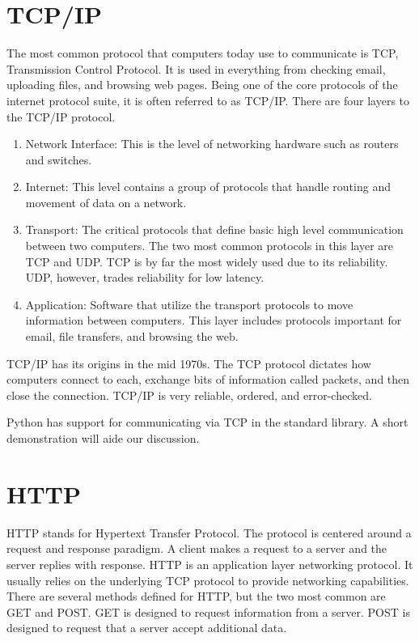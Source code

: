 \section*{TCP/IP}
The most common protocol that computers today use to communicate is TCP, Transmission Control Protocol.
It is used in everything from checking email, uploading files, and browsing web pages.
Being one of the core protocols of the internet protocol suite, it is often referred to as TCP/IP.
There are four layers to the TCP/IP protocol.
\begin{enumerate}
\item Network Interface: This is the level of networking hardware such as routers and switches.
\item Internet: This level contains a group of protocols that handle routing and movement of data on a network.
\item Transport: The critical protocols that define basic high level communication between two computers.
The two most common protocols in this layer are TCP and UDP.  TCP is by far the most widely used due to its reliability.
UDP, however, trades reliability for low latency.
\item Application: Software that utilize the transport protocols to move information between computers.
This layer includes protocols important for email, file transfers, and browsing the web.
\end{enumerate}

TCP/IP has its origins in the mid 1970s.
The TCP protocol dictates how computers connect to each, exchange bits of information called packets, and then close the connection.
TCP/IP is very reliable, ordered, and error-checked.

Python has support for communicating via TCP in the standard library.
A short demonstration will aide our discussion.




\section*{HTTP}
HTTP stands for Hypertext Transfer Protocol.
The protocol is centered around a request and response paradigm.
A client makes a request to a server and the server replies with response.
HTTP is an application layer networking protocol.
It usually relies on the underlying TCP protocol to provide networking capabilities.
There are several methods defined for HTTP, but the two most common are GET and POST.
GET is designed to request information from a server.
POST is designed to request that a server accept additional data.

